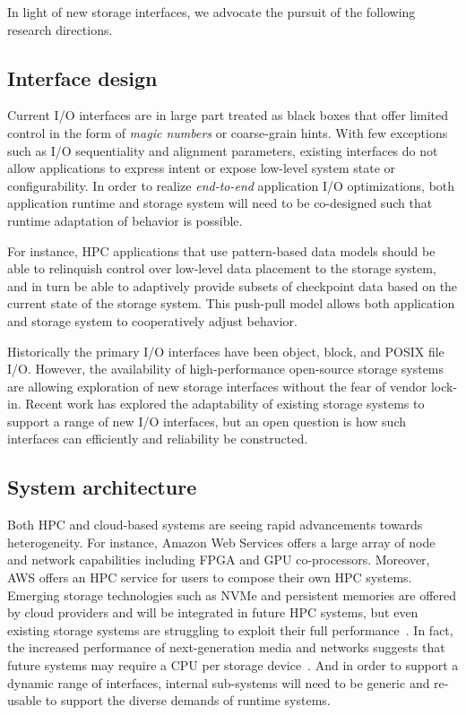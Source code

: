 \documentclass{sig-alternate}
\begin{document}
In light of new storage interfaces, we advocate the pursuit of the following
research directions.

\newpage
\subsection{Interface design}

Current I/O interfaces are in large part treated as black boxes that offer
limited control in the form of \emph{magic numbers} or coarse-grain hints. With
few exceptions such as I/O sequentiality and alignment parameters, existing
interfaces do not allow applications to express intent or expose low-level system state
or configurability. In order to realize {\it end-to-end} application I/O optimizations,
both application runtime and storage system will need to be co-designed such that runtime
adaptation of behavior is possible.

For instance, HPC applications that use pattern-based data models should be able
to relinquish control over low-level data placement to the storage system, and
in turn be able to adaptively provide subsets of checkpoint data based on the
current state of the storage system. This push-pull model allows both
application and storage system to cooperatively adjust behavior.

Historically the primary I/O interfaces have been object, block, and POSIX file
I/O. However, the availability of high-performance open-source storage systems
are allowing exploration of new storage interfaces without the fear of vendor
lock-in.  Recent work has explored the adaptability of existing storage systems
to support a range of new I/O interfaces, but an open question is how such
interfaces can efficiently and reliability be constructed.

\subsection{System architecture}

Both HPC and cloud-based systems are seeing rapid advancements towards
heterogeneity. For instance, Amazon Web Services offers a large array of node
and network capabilities including FPGA and GPU co-processors. Moreover, AWS
offers an HPC service for users to compose their own HPC systems. Emerging
storage technologies such as NVMe and persistent memories are offered by cloud
providers and will be integrated in future HPC systems, but even existing
storage systems are struggling to exploit their full
performance~\cite{xu:fast16-nova}. In fact, the increased performance of
next-generation media and networks suggests that future systems may require a
CPU per storage device~\cite{samuels:oss16}. And in order to support a dynamic
range of interfaces, internal sub-systems will need to be generic and re-usable
to support the diverse demands of runtime systems.
\end{document}
